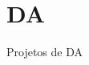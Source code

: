 \chapter{DA}
\hypertarget{md_README}{}\label{md_README}
\label{md_README_autotoc_md1}%
%
Projetos de DA 
